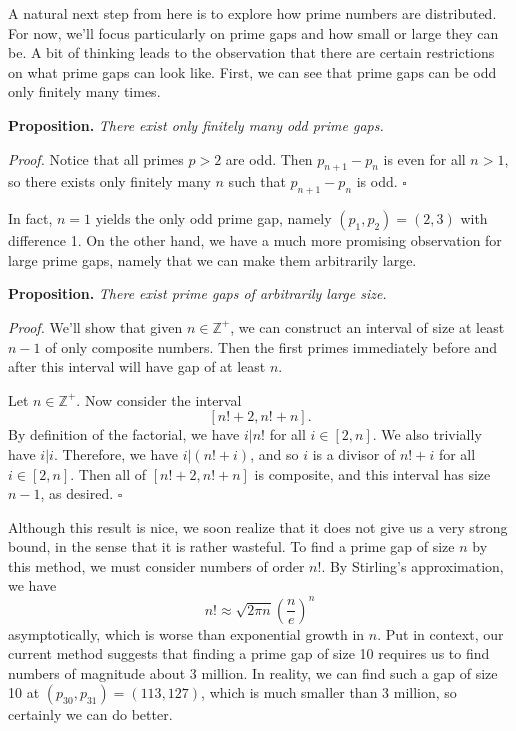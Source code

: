\documentclass[conference]{IEEEtran}
\begin{document}
A natural next step from here is to explore how prime numbers
are distributed. For now, we'll focus particularly on prime
gaps and how small or large they can be. A bit of
thinking leads to the observation that there are certain
restrictions on what prime gaps can look like. First,
we can see that prime gaps can be odd only finitely many
times.

\medskip\noindent
\textbf{Proposition.} \textit{There exist only finitely many odd prime
gaps.}

\smallskip\noindent
\textit{Proof.} Notice that all primes $p > 2$ are odd. Then
$p_{n+1} - p_n$ is even for all $n > 1$, so there exists
only finitely many $n$ such that $p_{n+1} - p_n$ is odd.
\hfill$\square$\medskip

In fact, $n = 1$ yields the only odd prime gap, namely
$(p_1, p_2) = (2, 3)$ with difference 1. On the other
hand, we have a much more promising observation for large
prime gaps, namely that we can make them arbitrarily large.

\medskip\noindent
\textbf{Proposition.} \textit{There exist prime gaps of arbitrarily
large size.}

\smallskip\noindent
\textit{Proof.} We'll show that given $n \in \mathbb{Z}^+$, we
can construct an interval of size at least $n - 1$ of only
composite numbers. Then the first primes immediately before
and after this interval will have gap of at least $n$.

Let $n \in \mathbb{Z}^+$. Now consider the interval
\[[n! + 2, n! + n].\] By definition of the
factorial, we have $i|n!$ for all $i \in [2, n]$. We also
trivially have $i|i$. Therefore, we have $i|(n! + i)$, and
so $i$ is a divisor of $n! + i$ for all $i \in [2, n]$.
Then all of $[n! + 2, n! + n]$ is composite, and this
interval has size $n - 1$, as desired.
\hfill$\square$\medskip

Although this result is nice, we soon realize that it does
not give us a very strong bound, in the sense that it is
rather wasteful. To find a prime gap of
size $n$ by this method, we must consider numbers of order
$n!$. By Stirling's approximation, we have
\[n! \approx \sqrt{2\pi n} \left(\frac{n}{e}\right)^n\]
asymptotically, which is worse than exponential growth in $n$.
Put in context, our current method suggests that finding
a prime gap of size 10 requires us to find numbers
of magnitude about 3 million. In reality, we can find such a
gap of size 10 at $(p_{30}, p_{31}) = (113, 127)$, which is
much smaller than 3 million, so certainly we can
do better.
\end{document}

